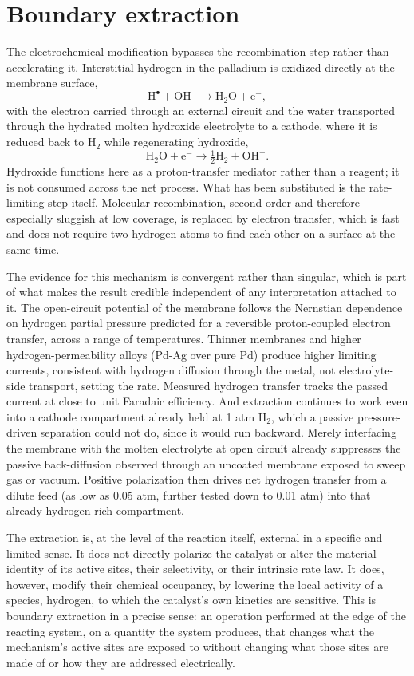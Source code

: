 \documentclass[11pt]{article}
\begin{document}
\section{Boundary extraction}

The electrochemical modification bypasses the recombination step rather than accelerating it. Interstitial hydrogen in the palladium is oxidized directly at the membrane surface,
\[
\mathrm{H^\bullet + OH^- \rightarrow H_2O + e^-},
\]
with the electron carried through an external circuit and the water transported through the hydrated molten hydroxide electrolyte to a cathode, where it is reduced back to H$_2$ while regenerating hydroxide,
\[
\mathrm{H_2O + e^- \rightarrow \tfrac{1}{2}H_2 + OH^-}.
\]
Hydroxide functions here as a proton-transfer mediator rather than a reagent; it is not consumed across the net process. What has been substituted is the rate-limiting step itself. Molecular recombination, second order and therefore especially sluggish at low coverage, is replaced by electron transfer, which is fast and does not require two hydrogen atoms to find each other on a surface at the same time.

The evidence for this mechanism is convergent rather than singular, which is part of what makes the result credible independent of any interpretation attached to it. The open-circuit potential of the membrane follows the Nernstian dependence on hydrogen partial pressure predicted for a reversible proton-coupled electron transfer, across a range of temperatures. Thinner membranes and higher hydrogen-permeability alloys (Pd-Ag over pure Pd) produce higher limiting currents, consistent with hydrogen diffusion through the metal, not electrolyte-side transport, setting the rate. Measured hydrogen transfer tracks the passed current at close to unit Faradaic efficiency. And extraction continues to work even into a cathode compartment already held at 1 atm H$_2$, which a passive pressure-driven separation could not do, since it would run backward. Merely interfacing the membrane with the molten electrolyte at open circuit already suppresses the passive back-diffusion observed through an uncoated membrane exposed to sweep gas or vacuum. Positive polarization then drives net hydrogen transfer from a dilute feed (as low as 0.05 atm, further tested down to 0.01 atm) into that already hydrogen-rich compartment.

The extraction is, at the level of the reaction itself, external in a specific and limited sense. It does not directly polarize the catalyst or alter the material identity of its active sites, their selectivity, or their intrinsic rate law. It does, however, modify their chemical occupancy, by lowering the local activity of a species, hydrogen, to which the catalyst's own kinetics are sensitive. This is boundary extraction in a precise sense: an operation performed at the edge of the reacting system, on a quantity the system produces, that changes what the mechanism's active sites are exposed to without changing what those sites are made of or how they are addressed electrically.
\end{document}
